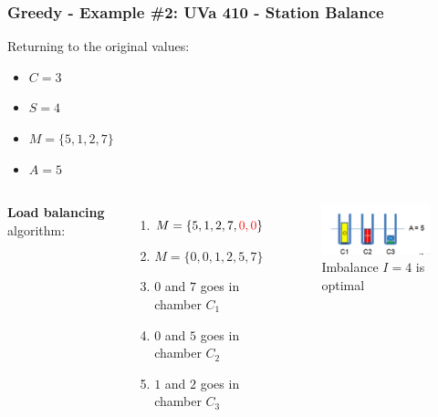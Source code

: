 \documentclass{beamer}
\begin{document}
\begin{frame}[fragile]
\frametitle{Greedy - Example \#2: UVa 410 - Station Balance}

Returning to the original values: 
\begin{itemize}
    \item $C=3$
    \item $S=4$
    \item $M=\{5,1,2,7\}$
    \item $A=5$
\end{itemize}

\vspace{0.3cm}

\begin{columns}
	\textbf{Load balancing} algorithm:

	\begin{enumerate}
    	\item $M=\{5,1,2,7,\color{red}0,0\color{black}\}$
	    \item $M=\{0,0,1,2,5,7\}$
    	\item $0$ and $7$ goes in chamber $C_1$
	    \item $0$ and $5$ goes in chamber $C_2$
    	\item $1$ and $2$ goes in chamber $C_3$
	\end{enumerate}
	
	\begin{figure}
	    \centering
    	\includegraphics[scale=0.5]{imgs/uva_410_5.png}
	    \caption{Imbalance $I=4$ is optimal}
	\end{figure}

\end{columns}

\end{frame}
\end{document}
